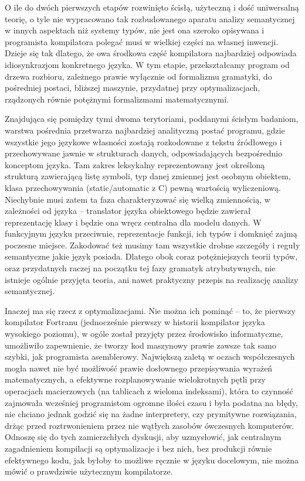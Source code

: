 O ile do dwóch pierwszych etapów rozwinięto ścisłą, użyteczną i dość uniwersalną teorię\cite{martin1998intuitionistic_types}\cite{TAPL}, o tyle nie wypracowano tak rozbudowanego aparatu analizy semantycznej w innych aspektach niż systemy typów, nie jest ona szeroko opisywana i programista kompilatora polegać musi w wielkiej części na własnej inwencji\cite{waite_goos}. Dzieje się tak dlatego, że owa środkowa część kompilatora najbardziej odpowiada idiosynkrazjom konkretnego języka. W tym etapie, przekształcamy program od drzewa rozbioru, zależnego prawie wyłącznie od formalizmu gramatyki, do pośredniej postaci, bliższej maszynie, przydatnej przy optymalizacjach, rządzonych równie potężnymi formalizmami matematycznymi. 

Znajdująca się pomiędzy tymi dwoma terytoriami, poddanymi ścisłym badaniom, warstwa pośrednia przetwarza najbardziej analityczną postać programu, gdzie wszystkie jego językowe własności zostają rozkodowane z tekstu źródłowego i przechowywane jawnie w strukturach danych, odpowiadających bezpośrednio konceptom języka. Tam zakres leksykalny reprezentowany jest określoną strukturą zawierającą listę symboli, typ danej zmiennej jest osobnym  obiektem, klasa przechowywania (static/automatic z C) pewną wartością wyliczeniową. Niechybnie musi zatem ta faza charakteryzować się wielką zmiennością, w zależności od języka – translator języka obiektowego będzie zawierał reprezentację klasy i będzie ona wręcz centralna dla modelu danych. W funkcyjnym języku przeciwnie, reprezentacje funkcji, ich typów i domknięć zajmą poczesne miejsce. Zakodować też musimy tam wszystkie drobne szczegóły i reguły semantyczne jakie język posiada. Dlatego obok coraz potężniejszych teorii typów, oraz przydatnych raczej na początku tej fazy gramatyk atrybutywnych, nie istnieje ogólnie przyjęta teoria, ani nawet praktyczny przepis na realizację analizy semantycznej.

Inaczej ma się rzecz z optymalizacjami. Nie można ich pominąć – to, że pierwszy kompilator Fortranu (jednocześnie pierwszy w historii kompilator języka wysokiego poziomu), w ogóle został przyjęty przez środowisko informatyczne, umożliwiło zapewnienie, że tworzy kod maszynowy prawie zawsze tak samo szybki, jak programista asemblerowy. Największą zaletą w oczach współczesnych mogła nawet nie być możliwość prawie dosłownego przepisywania wyrażeń matematycznych, a efektywne rozplanowywanie wielokrotnych pętli przy operacjach macierzowych (na tablicach z wieloma indeksami), która to czynność zajmowała wcześniej programistom ogromne ilości czasu i była podatna na błędy, nie chciano jednak godzić się na żadne interpretery, czy prymitywne rozwiązania, drżąc przed roztrwonieniem przez nie wątłych zasobów ówczesnych komputerów\cite{FORTRAN_AUTOMATIC_CODING_SYSTEM}.
Odnoszę się do tych zamierzchłych dyskusji, aby uzmysłowić, jak centralnym zagadnieniem kompilacji są optymalizacje i bez nich, bez produkcji równie efektywnego kodu, jak byłoby to możliwe ręcznie w języku docelowym, nie można mówić o prawdziwie użytecznym  kompilatorze.

